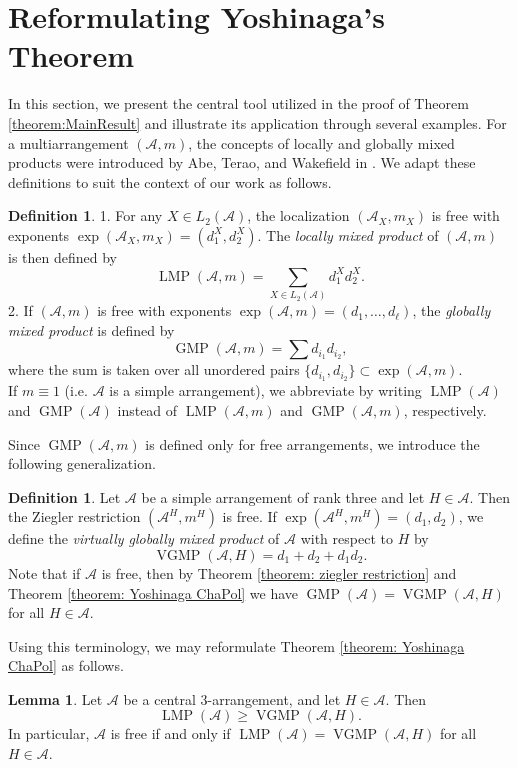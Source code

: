 \documentclass[12pt]{amsart}
\theoremstyle{definition}
\newtheorem{definition}[theorem]{Definition}
\newtheorem{lemma}[theorem]{Lemma}
\theoremstyle{remark}
\DeclareMathOperator{\LMP}{LMP}
\DeclareMathOperator{\GMP}{GMP}
\DeclareMathOperator{\VGMP}{VGMP}
\newcommand\CA{{\mathscr A}}
\begin{document}
\section{Reformulating Yoshinaga's Theorem}
In this section, we present the central tool utilized in the proof of Theorem \ref{theorem:MainResult} and illustrate its application through several examples. For a multiarrangement $(\CA,m)$, the concepts of locally and globally mixed products were introduced by Abe, Terao, and Wakefield in \cite{ATW07}. We adapt these definitions to suit the context of our work as follows.

\begin{definition}
1. For any $X\in L_2(\CA)$, the localization $(\CA_X,m_X)$ is free with exponents $\exp(\CA_X,m_X)=(d_1^X,d_2^X)$. The \emph{locally mixed product} of $(\CA,m)$ is then defined by
		\[\LMP (\CA,m)=\sum_{X\in L_2(\CA)} d_1^Xd_2^X.\]   
2. If $(\CA,m)$ is free with exponents $\exp(\CA,m)=(d_1,\dots,d_\ell)$, the \emph{globally mixed product} is defined by \[\GMP (\CA,m)=\sum d_{i_1}d_{i_2},\] where the sum is taken over all unordered pairs $\{d_{i_1},d_{i_2}\}\subset\exp(\CA,m)$.\\
If $m \equiv 1$ (i.e. $\CA$ is a simple arrangement), we abbreviate by writing $\LMP(\CA)$ and $\GMP(\CA)$ instead of $\LMP(\CA,m)$ and $\GMP(\CA,m)$, respectively.
\end{definition} 

Since $\GMP(\CA,m)$ is defined only for free arrangements, we introduce the following generalization.

\begin{definition} 
Let $\CA$ be a simple arrangement of rank three and let $H\in\CA$. Then the Ziegler restriction $(\CA^H,m^H)$ is free. If $\exp(\CA^H,m^H)=(d_1,d_2)$, we define the \emph{virtually globally mixed product} of $\CA$ with respect to $H$ by \[\VGMP(\CA, H)=d_1+d_2+d_1d_2.\]
Note that if $\CA$ is free, then by Theorem \ref{theorem: ziegler restriction} and Theorem \ref{theorem: Yoshinaga ChaPol} we have $\GMP(\CA)=\VGMP(\CA,H)$ for all $H\in\CA$.
\end{definition} 

Using this terminology, we may reformulate Theorem \ref{theorem: Yoshinaga ChaPol} as follows. 

\begin{lemma}\label{Lemma: LMP>=GMP for extensions}
Let $\CA$ be a central $3$-arrangement, and let $H\in\CA$. Then $$\LMP(\CA)\geq \VGMP(\CA, H).$$
In particular, $\CA$ is free if and only if $\LMP(\CA)=\VGMP(\CA, H)$ for all $H\in\CA$.
\end{lemma}
\end{document}
